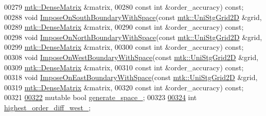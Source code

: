 \begin{DoxyCode}
00279                             \hyperlink{classmtk_1_1DenseMatrix}{mtk::DenseMatrix} &matrix,
00280                             \textcolor{keyword}{const} \textcolor{keywordtype}{int} &order\_accuracy) \textcolor{keyword}{const};
00288   \textcolor{keywordtype}{void} \hyperlink{classmtk_1_1BCDescriptor2D_af30c275cf06176a2ae9722014142c810}{ImposeOnSouthBoundaryWithSpace}(\textcolor{keyword}{const} 
      \hyperlink{classmtk_1_1UniStgGrid2D}{mtk::UniStgGrid2D} &grid,
00289                                       \hyperlink{classmtk_1_1DenseMatrix}{mtk::DenseMatrix} &matrix,
00290                                       \textcolor{keyword}{const} \textcolor{keywordtype}{int} &order\_accuracy) \textcolor{keyword}{const};
00298   \textcolor{keywordtype}{void} \hyperlink{classmtk_1_1BCDescriptor2D_a6b9b6f2bec06bce5a9070236ca10ec3a}{ImposeOnNorthBoundaryWithSpace}(\textcolor{keyword}{const} 
      \hyperlink{classmtk_1_1UniStgGrid2D}{mtk::UniStgGrid2D} &grid,
00299                                       \hyperlink{classmtk_1_1DenseMatrix}{mtk::DenseMatrix} &matrix,
00300                                       \textcolor{keyword}{const} \textcolor{keywordtype}{int} &order\_accuracy) \textcolor{keyword}{const};
00308   \textcolor{keywordtype}{void} \hyperlink{classmtk_1_1BCDescriptor2D_aa5d88027ff9c5d2eccab93cd51154c9e}{ImposeOnWestBoundaryWithSpace}(\textcolor{keyword}{const} 
      \hyperlink{classmtk_1_1UniStgGrid2D}{mtk::UniStgGrid2D} &grid,
00309                                      \hyperlink{classmtk_1_1DenseMatrix}{mtk::DenseMatrix} &matrix,
00310                                      \textcolor{keyword}{const} \textcolor{keywordtype}{int} &order\_accuracy) \textcolor{keyword}{const};
00318   \textcolor{keywordtype}{void} \hyperlink{classmtk_1_1BCDescriptor2D_a7208d08bfa84192e13c848093eaa88f0}{ImposeOnEastBoundaryWithSpace}(\textcolor{keyword}{const} 
      \hyperlink{classmtk_1_1UniStgGrid2D}{mtk::UniStgGrid2D} &grid,
00319                                      \hyperlink{classmtk_1_1DenseMatrix}{mtk::DenseMatrix} &matrix,
00320                                      \textcolor{keyword}{const} \textcolor{keywordtype}{int} &order\_accuracy) \textcolor{keyword}{const};
00321 
\hypertarget{mtk__bc__descriptor__2d_8h_source_l00322}{}\hyperlink{classmtk_1_1BCDescriptor2D_a3ef0bc7e9fbc16669099314dd34b170a}{00322}   \textcolor{keyword}{mutable} \textcolor{keywordtype}{bool} \hyperlink{classmtk_1_1BCDescriptor2D_a3ef0bc7e9fbc16669099314dd34b170a}{generate\_space\_}; 
00323 
\hypertarget{mtk__bc__descriptor__2d_8h_source_l00324}{}\hyperlink{classmtk_1_1BCDescriptor2D_aa18ef62f8eda355e47f51bcb5dbe8fe7}{00324}   \textcolor{keywordtype}{int} \hyperlink{classmtk_1_1BCDescriptor2D_aa18ef62f8eda355e47f51bcb5dbe8fe7}{highest\_order\_diff\_west\_}; 

\end{DoxyCode}
